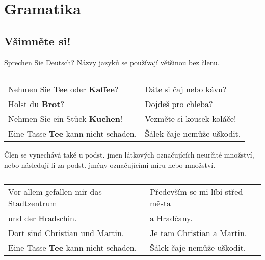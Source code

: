   \section*{Gramatika}
    \subsection*{Všimněte si!} %
      \hspace*{2em}Sprechen Sie Deutsch?\newline
      Názvy jazyků se používají většinou bez členu.
        \vspace*{-1em}
      \begin{table}[ht!]
        \hspace*{1em}
        \begin{tabular}{ll}  %
           Nehmen Sie \textbf{Tee} oder \textbf{Kaffee}? & Dáte si čaj nebo kávu?      \\
           Holst du \textbf{Brot}?                       & Dojdeš pro chleba?          \\
           Nehmen Sie ein Stück \textbf{Kuchen}!         & Vezměte si kousek koláče!   \\
           Eine Tasse \textbf{Tee} kann nicht schaden.   & Šálek čaje nemůže uškodit.  \\
        \end{tabular}
        \caption*{ }
      \end{table}

      Člen se vynechává také u podst. jmen látkových označujících neurčité množství, nebo následují-li za 
      podst. jmény označujícími míru nebo množství.
      \newpage
      \begin{table}[ht!]
        \hspace*{1em}
        \begin{tabular}{ll}  %
           Vor allem gefallen mir das Stadtzentrum  & Především se mi líbí střed města     \\
           \hspace*{3em}und der Hradschin.          & \hspace*{3em}a Hradčany.             \\
           Dort sind Christian und Martin.          & Je tam Christian a Martin.           \\
           Eine Tasse \textbf{Tee} kann nicht schaden.   & Šálek čaje nemůže uškodit.  \\
        \end{tabular}
        \caption*{ }
      \end{table}
      
